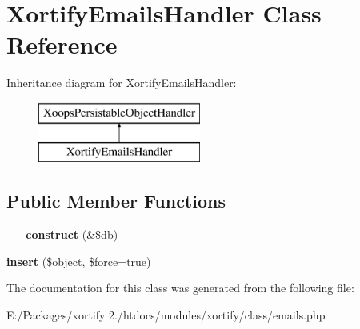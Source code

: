 \hypertarget{class_xortify_emails_handler}{\section{Xortify\-Emails\-Handler Class Reference}
\label{class_xortify_emails_handler}
}
Inheritance diagram for Xortify\-Emails\-Handler\-:\begin{figure}[H]
\begin{center}
\leavevmode
\includegraphics[height=2.000000cm]{class_xortify_emails_handler}
\end{center}
\end{figure}
\subsection*{Public Member Functions}
\begin{DoxyCompactItemize}
\item 
\hypertarget{class_xortify_emails_handler_ad7c6a9d722dfb4ba6ed239adc5ca08f6}{{\bfseries \-\_\-\-\_\-construct} (\&\$db)}\label{class_xortify_emails_handler_ad7c6a9d722dfb4ba6ed239adc5ca08f6}

\item 
\hypertarget{class_xortify_emails_handler_a353f7f972c3884017b9f62093b4f6c59}{{\bfseries insert} (\$object, \$force=true)}\label{class_xortify_emails_handler_a353f7f972c3884017b9f62093b4f6c59}

\end{DoxyCompactItemize}


The documentation for this class was generated from the following file\-:\begin{DoxyCompactItemize}
\item 
E\-:/\-Packages/xortify 2./htdocs/modules/xortify/class/emails.\-php\end{DoxyCompactItemize}
